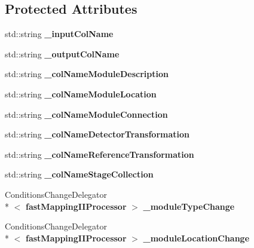 \subsection*{Protected Attributes}
\begin{DoxyCompactItemize}
\item 
std\-::string {\bfseries \-\_\-input\-Col\-Name}\label{classCALICE_1_1fastMappingIIProcessor_a406af5c65eb5b7fae75a9106701a41ce}

\item 
std\-::string {\bfseries \-\_\-output\-Col\-Name}\label{classCALICE_1_1fastMappingIIProcessor_a0ed73861a50691a4514c0444354d1731}

\item 
std\-::string {\bfseries \-\_\-col\-Name\-Module\-Description}\label{classCALICE_1_1fastMappingIIProcessor_a915ba9b5892f04844a61ccc01614db62}

\item 
std\-::string {\bfseries \-\_\-col\-Name\-Module\-Location}\label{classCALICE_1_1fastMappingIIProcessor_ac65181dd90dbb0696ab38e0a8ff6c164}

\item 
std\-::string {\bfseries \-\_\-col\-Name\-Module\-Connection}\label{classCALICE_1_1fastMappingIIProcessor_acfa571d0e14c1121db44ebc355a561f1}

\item 
std\-::string {\bfseries \-\_\-col\-Name\-Detector\-Transformation}\label{classCALICE_1_1fastMappingIIProcessor_af7bcda3e2cda9ee7e41dcf780243c1fd}

\item 
std\-::string {\bfseries \-\_\-col\-Name\-Reference\-Transformation}\label{classCALICE_1_1fastMappingIIProcessor_a7d554688321a42669be0482eac40daf3}

\item 
std\-::string {\bfseries \-\_\-col\-Name\-Stage\-Collection}\label{classCALICE_1_1fastMappingIIProcessor_ac85b4eccc768ff4ca78280aaadab1402}

\item 
Conditions\-Change\-Delegator\\*
$<$ {\bf fast\-Mapping\-I\-I\-Processor} $>$ {\bfseries \-\_\-module\-Type\-Change}\label{classCALICE_1_1fastMappingIIProcessor_a3bec21933dd1ca7dec20c925ec4a502a}

\item 
Conditions\-Change\-Delegator\\*
$<$ {\bf fast\-Mapping\-I\-I\-Processor} $>$ {\bfseries \-\_\-module\-Location\-Change}\label{classCALICE_1_1fastMappingIIProcessor_ac210ebf21a676091fbc1c481c90705b0}


\end{DoxyCompactItemize}
